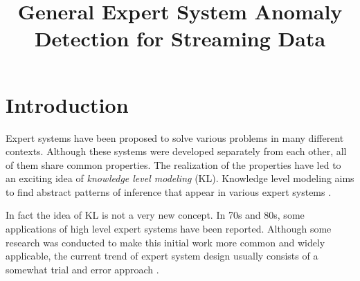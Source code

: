 \documentclass[conference]{IEEEtran}
\begin{document}
\title{General Expert System Anomaly Detection for Streaming Data}

\author{
}

\maketitle


\begin{abstract}

\end{abstract}

\IEEEpeerreviewmaketitle

\section{Introduction}

Expert systems have been proposed to solve various problems in many
different contexts.  Although these systems were developed separately
from each other, all of them share common properties.  The realization
of the properties have led to an exciting idea of \textit{knowledge level modeling} (KL).  
Knowledge level modeling aims to find abstract patterns of inference 
that appear in various expert systems
\cite{Menzies97object-orientedpatterns:}.

In fact the idea of KL is not a very new concept.  In 70s and 80s,
some applications of high level expert systems have been reported.
Although some research was conducted to make this initial work more
common and widely applicable, the current trend of expert system
design usually consists of a somewhat trial and error approach
\cite{Menzies1996}.
\end{document}
